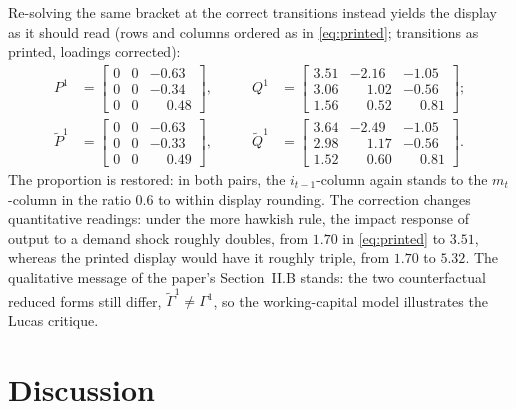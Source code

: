 \documentclass[11pt]{article}
\theoremstyle{remark}
\begin{document}
Re-solving the same bracket at the correct transitions instead yields the display as it should read (rows and columns ordered as in \eqref{eq:printed}; transitions as printed, loadings corrected):
\begin{equation*}
\begin{aligned}
P^1&=\begin{bmatrix} 0 & 0 & -0.63\\
0 & 0 & -0.34\\
0 & 0 & \phantom{-}0.48
\end{bmatrix},
&\qquad Q^1&=\begin{bmatrix} 3.51 & -2.16 & -1.05\\
3.06 & \phantom{-}1.02 & -0.56\\
1.56 & \phantom{-}0.52 & \phantom{-}0.81
\end{bmatrix};\\[4pt]
\tilde P^1&=\begin{bmatrix} 0 & 0 & -0.63\\
0 & 0 & -0.33\\
0 & 0 & \phantom{-}0.49
\end{bmatrix},
&\qquad \tilde Q^1&=\begin{bmatrix} 3.64 & -2.49 & -1.05\\
2.98 & \phantom{-}1.17 & -0.56\\
1.52 & \phantom{-}0.60 & \phantom{-}0.81
\end{bmatrix} .
\end{aligned}
\end{equation*}
The proportion is restored: in both pairs, the $i_{t-1}$-column again stands to the $m_t$-column in the ratio $0.6$ to within display rounding. The correction changes quantitative readings: under the more hawkish rule, the impact response of output to a demand shock roughly doubles, from $1.70$ in \eqref{eq:printed} to $3.51$, whereas the printed display would have it roughly triple, from $1.70$ to $5.32$. The qualitative message of the paper's Section~II.B stands: the two counterfactual reduced forms still differ, $\tilde\Gamma^1\neq\Gamma^1$, so the working-capital model illustrates the Lucas critique.

\section{Discussion}\label{sec:disc}
\end{document}
